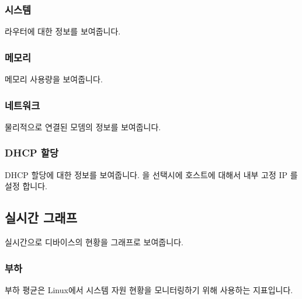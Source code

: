 \documentclass[letterpaper,10pt,english]{sphinxmanual}
\begin{document}
\subsubsection{시스템}
\label{\detokenize{main_menu/status:id3}}
\noindent{}

\sphinxAtStartPar
라우터에 대한 정보를 보여줍니다.


\subsubsection{메모리}
\label{\detokenize{main_menu/status:id4}}
\noindent{}

\sphinxAtStartPar
메모리 사용량을 보여줍니다.


\subsubsection{네트워크}
\label{\detokenize{main_menu/status:id5}}
\noindent{}

\sphinxAtStartPar
물리적으로 연결된 모뎀의 정보를 보여줍니다.


\subsubsection{DHCP 할당}
\label{\detokenize{main_menu/status:dhcp}}
\noindent{}

\sphinxAtStartPar
DHCP 할당에 대한 정보를 보여줍니다.  을 선택시에 호스트에 대해서 내부 고정 IP 를 설정 합니다.


\subsection{실시간 그래프}
\label{\detokenize{main_menu/status:id6}}
\sphinxAtStartPar
실시간으로 디바이스의 현황을 그래프로 보여줍니다.


\subsubsection{부하}
\label{\detokenize{main_menu/status:id7}}
\noindent{}

\sphinxAtStartPar
부하 평균은 Linux에서 시스템 자원 현황을 모니터링하기 위해 사용하는 지표입니다.
\end{document}
